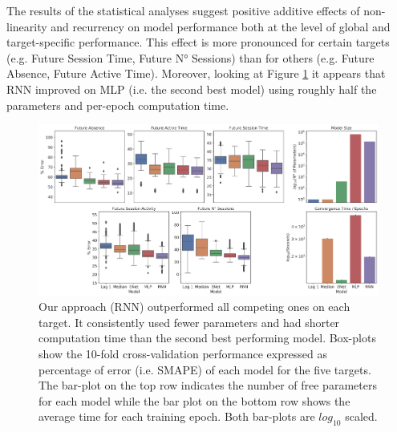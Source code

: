 The results of the statistical analyses suggest positive additive effects of non-linearity and recurrency on model performance both at the level of global and target-specific performance. This effect is more pronounced for certain targets (e.g. Future Session Time, Future N° Sessions) than for others (e.g. Future Absence, Future Active Time). Moreover, looking at Figure \ref{model_comp_exp_32} it appears that RNN improved on MLP (i.e. the second best model) using roughly half the parameters and per-epoch computation time. 





\begin{figure}[h]
\centering
\includegraphics[width=.7\textwidth]{images/chapter_3/performance_exploded_32.png}
\caption[\textbf{Dis-aggregated comparison of models' performance}]{Our approach (RNN) outperformed all competing ones on each target. It consistently used fewer parameters and had shorter computation time than the second best performing model. Box-plots show the 10-fold cross-validation performance expressed as percentage of error (i.e. SMAPE) of each model for the five targets. The bar-plot on the top row indicates the number of free parameters for each model while the bar plot on the bottom row shows the average time for each training epoch. Both bar-plots are $log_{10}$ scaled.}
\label{model_comp_exp_32} 
\end{figure}


